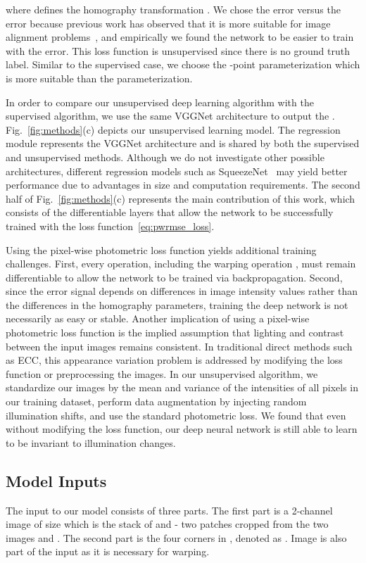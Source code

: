 \documentclass[letterpaper, 10 pt, conference]{ieeeconf}
\begin{document}
where  defines the homography transformation . We chose the  error versus the  error because previous work has observed that it is more suitable for image alignment problems~\cite{zhao2015l2}, and empirically we found the network to be easier to train with the  error. This loss function is unsupervised since there is no ground truth label. Similar to the supervised case, we choose the -point parameterization which is more suitable than the  parameterization. 








In order to compare our unsupervised deep learning algorithm with the supervised algorithm, we use the same VGGNet architecture to output the . Fig.~\ref{fig:methods}(c) depicts our unsupervised learning model. The regression module represents the VGGNet architecture and is shared by both the supervised and unsupervised methods. Although we do not investigate other possible architectures, different regression models such as SqueezeNet~\cite{iandola2016squeezenet} may yield better performance due to advantages in size and computation requirements. The second half of Fig.~\ref{fig:methods}(c) represents the main contribution of this work, which consists of the differentiable layers that allow the network to be successfully trained with the loss function~\eqref{eq:pwrmse_loss}.

Using the pixel-wise photometric loss function yields additional training challenges. First, every operation, including the warping operation , must remain differentiable to allow the network to be trained via backpropagation. Second, since the error signal depends on differences in image intensity values rather than the differences in the homography parameters, training the deep network is not necessarily as easy or stable. Another implication of using a pixel-wise photometric loss function is the implied assumption that lighting and contrast between the input images remains consistent. In traditional direct methods such as ECC, this appearance variation problem is addressed by modifying the loss function or preprocessing the images. In our unsupervised algorithm, we standardize our images by the mean and variance of the intensities of all pixels in our training dataset, perform data augmentation by injecting random illumination shifts, and use the standard  photometric loss. We found that even without modifying the loss function, our deep neural network is still able to learn to be invariant to illumination changes.
\subsection{Model Inputs}
The input to our model consists of three parts. The first part is a 2-channel image of size  which is the stack of  and  - two patches cropped from the two images  and . The second part is the four corners in , denoted as . Image  is also part of the input as it is necessary for warping.
 
\end{document}
